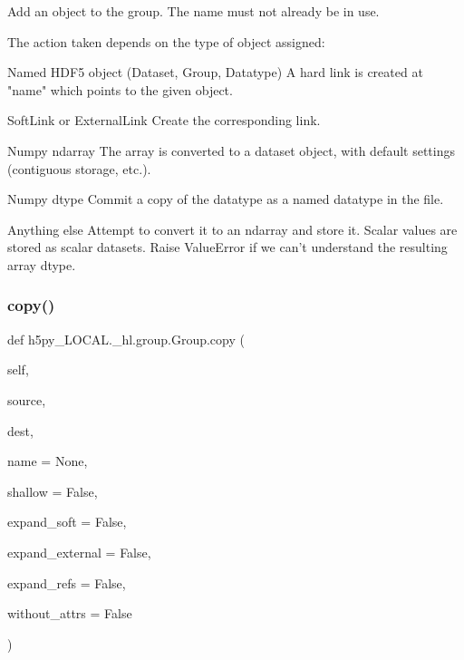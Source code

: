 \begin{DoxyVerb}Add an object to the group.  The name must not already be in use.

The action taken depends on the type of object assigned:

Named HDF5 object (Dataset, Group, Datatype)
    A hard link is created at "name" which points to the
    given object.

SoftLink or ExternalLink
    Create the corresponding link.

Numpy ndarray
    The array is converted to a dataset object, with default
    settings (contiguous storage, etc.).

Numpy dtype
    Commit a copy of the datatype as a named datatype in the file.

Anything else
    Attempt to convert it to an ndarray and store it.  Scalar
    values are stored as scalar datasets. Raise ValueError if we
    can't understand the resulting array dtype.
\end{DoxyVerb}
 \mbox{\label{classh5py__LOCAL_1_1__hl_1_1group_1_1Group_a7185c006ccbb516d5b34e6510b97c19a}} 
\subsubsection{\texorpdfstring{copy()}{copy()}}
{\footnotesize\ttfamily def h5py\+\_\+\+L\+O\+C\+A\+L.\+\_\+hl.\+group.\+Group.\+copy (\begin{DoxyParamCaption}\item[{}]{self,  }\item[{}]{source,  }\item[{}]{dest,  }\item[{}]{name = {\ttfamily None},  }\item[{}]{shallow = {\ttfamily False},  }\item[{}]{expand\+\_\+soft = {\ttfamily False},  }\item[{}]{expand\+\_\+external = {\ttfamily False},  }\item[{}]{expand\+\_\+refs = {\ttfamily False},  }\item[{}]{without\+\_\+attrs = {\ttfamily False} }\end{DoxyParamCaption})}

